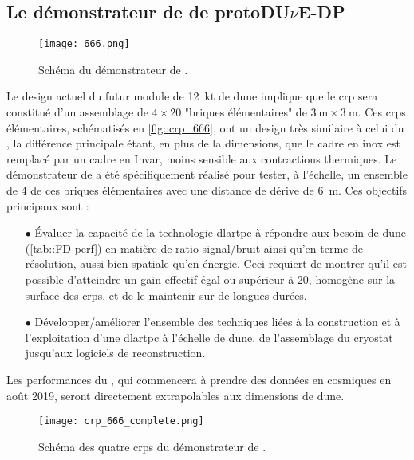     \subsection{Le démonstrateur de \SSS{} de proto\texorpdfstring{DU$\nu$E}{DUNE}-DP}

      \begin{figure}[!htb]
        \centering
        \texttt{[image: 666.png]}        
        \caption[Schéma du démonstrateur de \SSS{}]{\label{fig::666}Schéma du démonstrateur de \SSS{}.}
      \end{figure}

      Le design actuel du futur module de \SI{12}{\kilo\tonne}\cite{Acciarri2016a} de \gls{dune} implique que le \gls{crp} sera constitué d'un assemblage de $4\times20$ "briques élémentaires" de $\SI{3}{\meter}\times\SI{3}{\meter}$. Ces \glspl{crp} élémentaires, schématisés en \autoref{fig::crp_666}, ont un design très similaire à celui du \TOO{}, la différence principale étant, en plus de la dimensions, que le cadre en inox est remplacé par un cadre en Invar, moins sensible aux contractions thermiques. Le démonstrateur de \SSS{} a été spécifiquement réalisé pour tester, à l'échelle, un ensemble de 4 de ces briques élémentaires avec une distance de dérive de \SI{6}{\meter}. Ces objectifs principaux sont :
      \begin{itemize}
        \item[$\bullet$] Évaluer la capacité de la technologie \gls{dlartpc} à répondre aux besoin de \gls{dune} (\autoref{tab::FD-perf}) en matière de ratio signal/bruit ainsi qu'en terme de résolution, aussi bien spatiale qu'en énergie. Ceci requiert de montrer qu'il est possible d'atteindre un gain effectif égal ou supérieur à 20, homogène sur la surface des \glspl{crp}, et de le maintenir sur de longues durées.
        \item[$\bullet$] Développer/améliorer l'ensemble des techniques liées à la construction et à l'exploitation d'une \gls{dlartpc} à l'échelle de \gls{dune}, de l'assemblage du cryostat jusqu'aux logiciels de reconstruction.
      \end{itemize}
      Les performances du \SSS{}, qui commencera à prendre des données en cosmiques en août 2019, seront directement extrapolables aux dimensions de \gls{dune}.

      \begin{figure}[!htb]
        \centering
        \texttt{[image: crp\_666\_complete.png]}
        \caption[Schéma des CRPs du \SSS{}]{\label{fig::crp_666}Schéma des quatre \glspl{crp} du démonstrateur de \SSS{}.}
      \end{figure}

